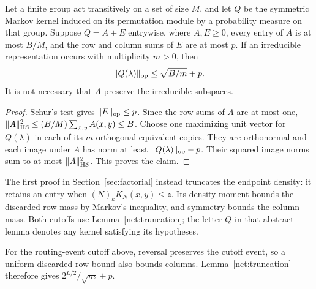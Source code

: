 \begin{lemma}\label{net:truncation}
Let a finite group act transitively on a set of size $M$, and let $Q$ be the symmetric Markov kernel induced on its permutation module by a probability measure on that group. Suppose $Q=A+E$ entrywise, where $A,E\ge0$, every entry of $A$ is at most $B/M$, and the row and column sums of $E$ are at most $p$. If an irreducible representation occurs with multiplicity $m>0$, then
\[
 \|Q(\lambda)\|_{\mathrm{op}}\le \sqrt{B/m}+p.
\]
It is not necessary that $A$ preserve the irreducible subspaces.
\end{lemma}
\begin{proof}
Schur's test gives $\|E\|_{\mathrm{op}}\le p$. Since the row sums of $A$ are at most one,
$\|A\|_{\mathrm{HS}}^2\le(B/M)\sum_{x,y}A(x,y)\le B$.
Choose one maximizing unit vector for $Q(\lambda)$ in each of its $m$ orthogonal equivalent copies. They are orthonormal and each image under $A$ has norm at least $\|Q(\lambda)\|_{\mathrm{op}}-p$. Their squared image norms sum to at most $\|A\|_{\mathrm{HS}}^2$. This proves the claim.
\end{proof}
The first proof in Section~\ref{sec:factorial} instead truncates the endpoint density: it retains an entry when $(N)_kK_N(x,y)\le z$. Its density moment bounds the discarded row mass by Markov's inequality, and symmetry bounds the column mass. Both cutoffs use Lemma~\ref{net:truncation}; the letter $Q$ in that abstract lemma denotes any kernel satisfying its hypotheses.

For the routing-event cutoff above, reversal preserves the cutoff event, so a uniform discarded-row bound also bounds columns. Lemma~\ref{net:truncation} therefore gives $2^{L/2}/\sqrt m+p$.


